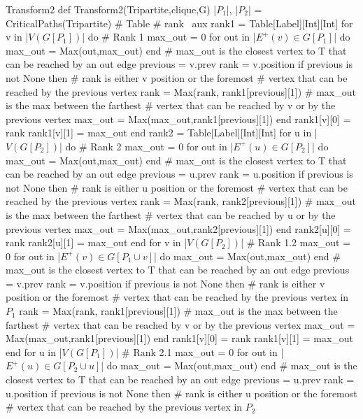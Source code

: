 \begin{code}{Transform2}
def Transform2(Tripartite,clique,G)
  |$P_1$|, |$P_2$| = CriticalPaths(Tripartite)
  # Table
  # rank \ aux
  rank1 = Table[Label][Int][Int]
  for v in |$V(G[P_1])$| do # Rank 1
    max_out = 0
    for out in |$E^+(v) \in G[P_1]$| do
      max_out = Max(out,max_out)
    end # max_out is the closest vertex to T that can be reached by an out edge
    previous = v.prev
    rank = v.position
    if previous is not None then
      # rank is either v position or the foremost 
      # vertex that can be reached by the previous vertex
      rank = Max(rank, rank1[previous][1]) 
      # max_out is the max between the farthest
      # vertex that can be reached by v or by the previous vertex
      max_out = Max(max_out,rank1[previous][1])  
    end
    rank1[v][0] = rank
    rank1[v][1] = max_out
  end
  rank2 = Table[Label][Int][Int]
  for u in |$V(G[P_2])$| do # Rank 2
    max_out = 0
    for out in |$E^+(u) \in G[P_2]$| do
      max_out = Max(out,max_out)
    end # max_out is the closest vertex to T that can be reached by an out edge
    previous = u.prev
    rank = u.position
    if previous is not None then
      # rank is either u position or the foremost 
      # vertex that can be reached by the previous vertex
      rank = Max(rank, rank2[previous][1]) 
      # max_out is the max between the farthest
      # vertex that can be reached by u or by the previous vertex 
      max_out = Max(max_out,rank2[previous][1]) 
    end
    rank2[u][0] = rank
    rank2[u][1] = max_out
  end
  for v in |$V(G[P_2])$| # Rank 1.2
    max_out = 0
    for out in |$E^+(v) \in G[P_1 \cup v]$| do
      max_out = Max(out,max_out)
    end # max_out is the closest vertex to T that can be reached by an out edge
    previous = v.prev
    rank = v.position
    if previous is not None then
      # rank is either v position or the foremost 
      # vertex that can be reached by the previous vertex in $P_1$
      rank = Max(rank, rank1[previous][1]) 
      # max_out is the max between the farthest
      # vertex that can be reached by v or by the previous vertex
      max_out = Max(max_out,rank1[previous][1])  
    end
    rank1[v][0] = rank
    rank1[v][1] = max_out
  end
  for u in |$V(G[P_1])$| # Rank 2.1
    max_out = 0
    for out in |$E^+(u) \in G[P_2 \cup u]$| do
      max_out = Max(out,max_out)
    end # max_out is the closest vertex to T that can be reached by an out edge
    previous = u.prev
    rank = u.position
    if previous is not None then
      # rank is either u position or the foremost 
      # vertex that can be reached by the previous vertex in $P_2$

\end{code}
